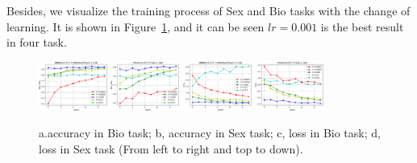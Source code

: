\documentclass[sigconf]{acmart}
\begin{document}
	Besides, we visualize the training process of Sex and Bio tasks with the change of learning. It is shown in Figure~\ref{lr_result}, and it can be seen $lr=0.001$ is the best result in four task. 
	
	\begin{figure}[]
		\centering
		\includegraphics[width=0.2\textwidth]{../figs/lr_acc_bio.pdf}
		\includegraphics[width=0.2\textwidth]{../figs/lr_acc_sex.pdf}
		\includegraphics[width=0.2\textwidth]{../figs/lr_loss_bio.pdf}
		\includegraphics[width=0.2\textwidth]{../figs/lr_loss_sex.pdf}
		\caption{a.accuracy in Bio task;  b, accuracy in Sex task; c, loss in Bio task; d, loss in Sex task (From left to right and top to down). }
		\label{lr_result}
		\centering
	\end{figure}
	
	
\end{document}
